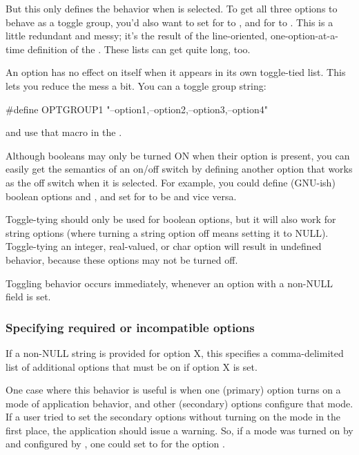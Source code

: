 But this only defines the behavior when  is selected.  To
get all three options to behave as a toggle group, you'd also want to
set  for  to , and
 for  to . This is a
little redundant and messy; it's the result of the line-oriented,
one-option-at-a-time definition of the .  These
lists can get quite long, too.

An option has no effect on itself when it appears in its own
toggle-tied list. This lets you reduce the mess a bit. You can
 a toggle group string: 

\begin{cchunk}
  #define OPTGROUP1 "--option1,--option2,--option3,--option4"
\end{cchunk}

and use that  macro in the .

Although booleans may only be turned ON when their option is present,
you can easily get the semantics of an on/off switch by defining
another option that works as the off switch when it is selected. For
example, you could define (GNU-ish) boolean options  and
, and set  for  to be
 and vice versa.  

Toggle-tying should only be used for boolean options, but it will also
work for string options (where turning a string option off means
setting it to NULL). Toggle-tying an integer, real-valued, or char
option will result in undefined behavior, because these options may
not be turned off.

Toggling behavior occurs immediately, whenever an option with a
non-NULL  field is set.



   \subsubsection{Specifying required or incompatible options}

If a non-NULL string  is provided for option X,
this specifies a comma-delimited list of additional options that must
be on if option X is set. 

One case where this behavior is useful is when one (primary) option
turns on a mode of application behavior, and other (secondary) options
configure that mode. If a user tried to set the secondary options
without turning on the mode in the first place, the application should
issue a warning. So, if a mode was turned on by  and
configured by , one could set
 to  for the option
.

